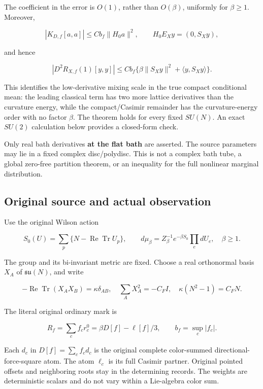 \documentclass[
  11pt,
]{article}
\begin{document}
The coefficient in the error is \(O(1)\), rather than \(O(\beta)\),
uniformly for \(\beta\ge1\). Moreover,

\[
 |K_{D,f}[a,a]|\le Cb_f\|H_0a\|^2,
 \qquad H_0E_Xy=(0,S_Xy),
\]

and hence

\[
 \boxed{
 |D^2R_{X,f}(1)[y,y]|
 \le Cb_f\{\beta\|S_Xy\|^2+\langle y,S_Xy\rangle\}.}
                                                        \tag{2}
\]

This identifies the low-derivative mixing scale in the true compact
conditional mean: the leading classical term has two more lattice
derivatives than the curvature energy, while the compact/Casimir
remainder has the curvature-energy order with no factor \(\beta\). The
theorem holds for every fixed \(SU(N)\). An exact \(SU(2)\) calculation
below provides a closed-form check.

Only real bath derivatives \textbf{at the flat bath} are asserted. The
source parameters may lie in a fixed complex disc/polydisc. This is not
a complex bath tube, a global zero-free partition theorem, or an
inequality for the full nonlinear marginal distribution.

\hypertarget{original-source-and-actual-observation}{%
\subsection{Original source and actual
observation}\label{original-source-and-actual-observation}}

Use the original Wilson action

\[
 S_0(U)=\sum_p\{N-\operatorname{Re}\operatorname{Tr}U_p\},
 \qquad d\mu_\beta=Z_\beta^{-1}e^{-\beta S_0}\prod_e dU_e,
 \quad \beta\ge1.
\]

The group and its bi-invariant metric are fixed. Choose a real
orthonormal basis \(X_A\) of \(\mathfrak{su}(N)\), and write

\[
 -\operatorname{Re}\operatorname{Tr}(X_AX_B)=\kappa\delta_{AB},
 \quad \sum_A X_A^2=-C_FI,
 \quad \kappa(N^2-1)=C_FN.                       \tag{3}
\]

The literal original ordinary mark is

\[
 R_f=\sum_c f_c r_c^0
 =\beta D[f]-\ell[f]/3,
 \qquad b_f=\sup_c|f_c|.
                                                        \tag{4}
\]

Each \(d_c\) in \(D[f]=\sum_cf_cd_c\) is the original complete
color-summed directional-force-square atom. The atom \(\ell_c\) is its
full Casimir partner. Original pointed offsets and neighboring roots
stay in the determining records. The weights are deterministic scalars
and do not vary within a Lie-algebra color sum.
\end{document}
